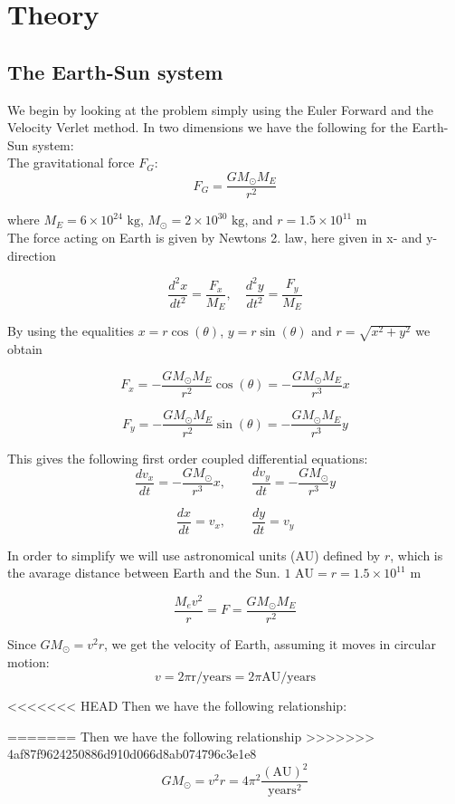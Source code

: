 \documentclass[../main.tex]{subfiles}
\begin{document}
\section{Theory}\label{theory}
\subsection{The Earth-Sun system}
We begin by looking at the problem simply using the Euler Forward and the Velocity Verlet method.
In two dimensions we have the following for the Earth-Sun system: \\

\noindent The gravitational force $F_G$:
$$F_G= \frac{GM_{\odot}M_E}{r^2}$$

where $M_E = 6\times 10^{24}\text{ kg}$,  $ M_{\odot} = 2\times 10^{30}\text{ kg}$, and  $r = 1.5\times 10^{11}\text{ m}$\\
The force acting on Earth is given by Newtons 2. law, here given in x- and y- direction

$$ \frac{d^2x}{dt^2} = \frac{F_x}{M_E}, \quad \frac{d^2y}{dt^2} = \frac{F_y}{M_E}$$

By using the equalities $x = r \cos(\theta)$,  $y = r\sin(\theta)$ and $r = \sqrt{x^2 +y^2}$ we obtain

$$F_x = - \frac{GM_{\odot}M_E}{r^2} \cos(\theta) =- \frac{GM_{\odot}M_E}{r^3}x$$

$$F_y = - \frac{GM_{\odot}M_E}{r^2}\sin(\theta) =- \frac{GM_{\odot}M_E}{r^3}y$$


This gives the following first order  coupled differential equations:
$$ \frac{dv_x}{dt} = - \frac{GM_{\odot}}{r^3}x,\qquad \frac{dv_y}{dt} = - \frac{GM_{\odot}}{r^3}y$$

  $$\frac{dx}{dt} = v_x,\qquad \frac{dy}{dt} = v_y$$

In order to simplify we will use astronomical units (AU) defined by $r$, which is the avarage distance between Earth and the Sun. $1\text{ AU}= r = 1.5 \times 10^{11}\text{ m}$


$$ \frac{M_ev^2}{r} = F = \frac{GM_{\odot}M_E}{r^2}$$


Since $GM_{\odot} = v^2r$, we get the velocity of Earth, assuming it moves in circular motion: $$v = 2\pi \text{r/years}= 2\pi \text{AU/years}$$

<<<<<<< HEAD
Then we have the following relationship:

=======
Then we have the following relationship
>>>>>>> 4af87f9624250886d910d066d8ab074796c3e1e8
$$GM_{\odot} = v^2r = 4\pi^2 \frac{(\text{AU})^2}{\text{years}^2}$$
\end{document}
